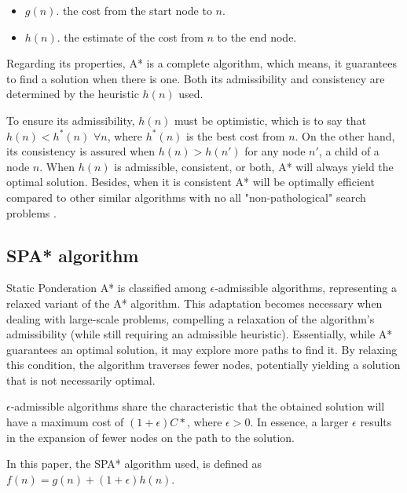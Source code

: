 \documentclass[runningheads]{llncs}
\begin{document}
\begin{itemize}
    \item \textbf{$g(n)$}. the cost from the start node to $n$.
    \item \textbf{$h(n)$}. the estimate of the cost from $n$ to the end node.
\end{itemize}

Regarding its properties, A* is a complete algorithm, which means, it guarantees to find a solution when there is one. Both its admissibility and consistency are determined by the heuristic $h(n)$ used.

To ensure its admissibility, $h(n)$ must be optimistic, which is to say that $h(n) < h^*(n)$ $\forall n$, where $h^*(n)$ is the best cost from $n$. On the other hand, its consistency is assured when $h(n) > h(n')$ for any node $n'$, a child of a node $n$. When $h(n)$ is admissible, consistent, or both, A* will always yield the optimal solution. Besides, when it is consistent A* will be optimally efficient compared to other similar algorithms with no all "non-pathological" search problems \cite{optimality-astar}.

\subsection{SPA* algorithm}
Static Ponderation A*\cite{theory-book} is classified among $\epsilon$-admissible algorithms, representing a relaxed variant of the A* algorithm. This adaptation becomes necessary when dealing with large-scale problems, compelling a relaxation of the algorithm's admissibility (while still requiring an admissible heuristic). Essentially, while A* guarantees an optimal solution, it may explore more paths to find it. By relaxing this condition, the algorithm traverses fewer nodes, potentially yielding a solution that is not necessarily optimal.

$\epsilon$-admissible algorithms share the characteristic that the obtained solution will have a maximum cost of $(1 + \epsilon)C*$, where $\epsilon > 0$. In essence, a larger $\epsilon$ results in the expansion of fewer nodes on the path to the solution.

In this paper, the SPA* algorithm used, is defined as $f(n) = g(n) + (1 + \epsilon)h(n)$.

% 
%
\end{document}
